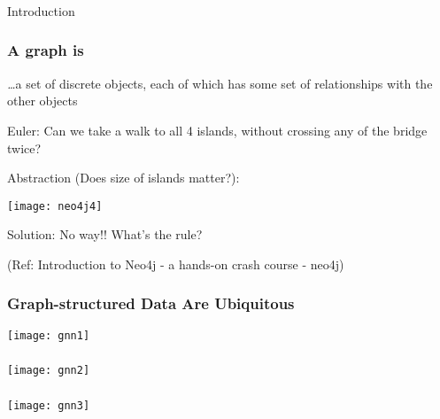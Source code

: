 \begin{frame}[fragile]\frametitle{}
\begin{center}
{\Large Introduction}
\end{center}
\end{frame}



\begin{frame}\frametitle{A graph is}
{\emph \ldots a set of discrete objects, each of which has some set of relationships with the other objects}

Euler: Can we take a walk to all 4 islands, without crossing any of the bridge twice?

Abstraction (Does size of islands matter?):

\begin{center}
\texttt{[image: neo4j4]}
\end{center}	  

Solution: No way!! What's the rule?

{\tiny (Ref: Introduction to Neo4j - a hands-on crash course - neo4j)}
\end{frame}


\begin{frame}[fragile]\frametitle{ Graph-structured Data Are Ubiquitous }

\begin{center}
\texttt{[image: gnn1]}
\end{center}	  

\end{frame}

\begin{frame}[fragile]\frametitle{}

\begin{center}
\texttt{[image: gnn2]}
\end{center}	  

\end{frame}

\begin{frame}[fragile]\frametitle{}

\begin{center}
\texttt{[image: gnn3]}
\end{center}	  

\end{frame}

